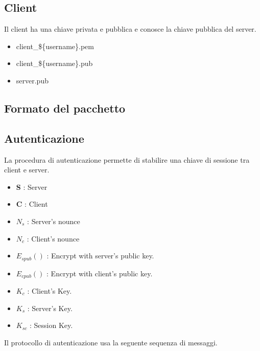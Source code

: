 \documentclass[a4paper,titlepage]{article}
\begin{document}
\subsection{Client}
Il client ha una chiave privata e pubblica e conosce la chiave pubblica del server.
\begin{itemize}
\item client\_\$\{username\}.pem
\item client\_\$\{username\}.pub
\item server.pub
\end{itemize}

\subsection{Formato del pacchetto}

\subsection{Autenticazione}
La procedura di autenticazione permette di stabilire una chiave di sessione tra client e server.
\begin{itemize}
\item \textbf{S} : Server
\item \textbf{C} : Client
\item $N_s$ : Server's nounce
\item $N_c$ : Client's nounce
\item $E_{spub} ()$ : Encrypt with server's public key. 
\item $E_{cpub} ()$ : Encrypt with client's public key.
\item $K_c$ : Client's Key.
\item $K_s$ : Server's Key.
\item $K_{sc}$ : Session Key.
\end{itemize}
Il protocollo di autenticazione usa la seguente sequenza di messaggi.
\end{document}
